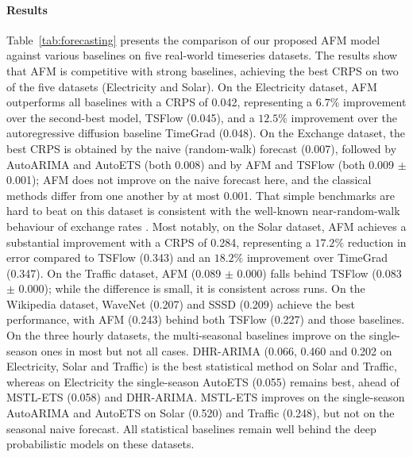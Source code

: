 \documentclass[preprint,12pt,authoryear]{elsarticle}
\newcommand{\oldrev}[1]{#1}
\newcommand{\rev}[1]{#1}
\newcommand{\rev}[1]{\textcolor{blue}{#1}}
\begin{document}
\paragraph{Results}
Table~\ref{tab:forecasting} presents the comparison of our proposed AFM model against various baselines on five real-world timeseries datasets. \rev{The results show that AFM is competitive with strong baselines, achieving the best CRPS on two of the five datasets (Electricity and Solar).} On the Electricity dataset, AFM outperforms all baselines with a CRPS of 0.042, representing a $6.7\%$ improvement over the second-best model, TSFlow (0.045), and a $12.5\%$ improvement over the autoregressive diffusion baseline TimeGrad (0.048). \rev{On the Exchange dataset, the best CRPS is obtained by the naive (random-walk) forecast (0.007), followed by AutoARIMA and AutoETS (both 0.008) and by AFM and TSFlow (both 0.009 $\pm$ 0.001); AFM does not improve on the naive forecast here, and the classical methods differ from one another by at most 0.001. That simple benchmarks are hard to beat on this dataset is consistent with the well-known near-random-walk behaviour of exchange rates \citep{meese1983empirical}.}
Most notably, on the Solar dataset, AFM achieves a substantial improvement with a CRPS of 0.284, representing a $17.2\%$ reduction in error compared to TSFlow (0.343) and an $18.2\%$ improvement over TimeGrad (0.347). \oldrev{On the Traffic dataset, AFM (0.089 $\pm$ 0.000) falls behind TSFlow (0.083 $\pm$ 0.000); while the difference is small, it is consistent across runs. On the Wikipedia dataset, WaveNet (0.207) and SSSD (0.209) achieve the best performance, with AFM (0.243) behind both TSFlow (0.227) and those baselines.} \rev{On the three hourly datasets, the multi-seasonal baselines improve on the single-season ones in most but not all cases. DHR-ARIMA (0.066, 0.460 and 0.202 on Electricity, Solar and Traffic) is the best statistical method on Solar and Traffic, whereas on Electricity the single-season AutoETS (0.055) remains best, ahead of MSTL-ETS (0.058) and DHR-ARIMA. MSTL-ETS improves on the single-season AutoARIMA and AutoETS on Solar (0.520) and Traffic (0.248), but not on the seasonal naive forecast. All statistical baselines remain well behind the deep probabilistic models on these datasets.}
\end{document}
